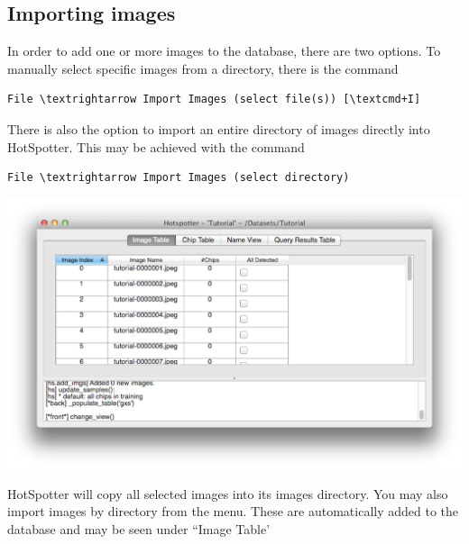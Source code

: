 \documentclass[a4paper,10pt]{article}
\begin{document}
    \subsection{Importing images}
        In order to add one or more images to the database, there are two options. To manually select specific images from a directory, there is the command
        \begin{Verbatim}[commandchars=\\\{\}]
        File \textrightarrow Import Images (select file(s)) [\textcmd+I]
        \end{Verbatim}
        There is also the option to import an entire directory of images directly into HotSpotter.  This may be achieved with the command 
        \begin{Verbatim}[commandchars=\\\{\}]
        File \textrightarrow Import Images (select directory)
        \end{Verbatim}
        \begin{center}
            \includegraphics[scale=0.15]{images/added.png}
        \end{center}
        HotSpotter will copy all selected images into its images directory.  You may also import images by directory from the menu.
        These are automatically added to the database and may be seen under ``Image Table'
\end{document}
